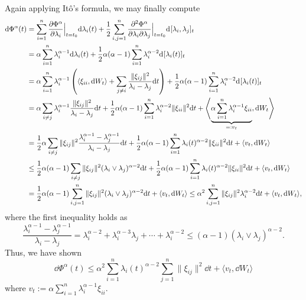 Again applying Itô's formula, we may finally compute
\begin{align*}
  \dd \Phi^\alpha(t) & = \sum_{i = 1}^n \pdv{\Phi^\alpha}{\lambda_i}\Big\vert_{t = t_0} \dd \lambda_i(t)
    + \frac{1}{2}\sum_{i, j = 1}^n \pdv[2]{\Phi^\alpha}{\lambda_i}{\lambda_j}\Big\vert_{t = t_0} \dd[][\lambda_i, \lambda_j]_{t}\\
  & = \alpha \sum_{i = 1}^n \lambda_i^{\alpha - 1} \dd \lambda_i(t)
    + \frac{1}{2}\alpha(\alpha - 1)\sum_{i = 1}^n \lambda_i^{\alpha - 2} \dd[][\lambda_i(t)]_{t}\\
  & = \alpha \sum_{i = 1}^n \lambda_i^{\alpha - 1} \left(\langle \xi_{ii}, \dd W_t\rangle 
    + \sum_{j \neq i} \frac{\|\xi_{ij}\|^2}{\lambda_i - \lambda_j} \dd t\right) 
    + \frac{1}{2}\alpha(\alpha - 1)\sum_{i = 1}^n \lambda_i^{\alpha - 2} \dd[][\lambda_i(t)]_{t}\\
  & = \alpha \sum_{i \neq j}\lambda_i^{\alpha - 1} \frac{\|\xi_{ij}\|^2}{\lambda_i - \lambda_j} \dd t 
    + \frac{1}{2}\alpha(\alpha - 1)\sum_{i = 1}^n \lambda_i^{\alpha - 2} \|\xi_{ii}\|^2 \dd t
    + \left\langle\underbrace{\alpha \sum_{i = 1}^n \lambda_i^{\alpha - 1} \xi_{ii}}_{=: v_t}, \dd W_t\right\rangle\\
  & = \frac{1}{2}\alpha \sum_{i \neq j}\|\xi_{ij}\|^2\frac{\lambda_i^{\alpha - 1} - \lambda_j^{\alpha -1}}{\lambda_i - \lambda_j}\dd t
    + \frac{1}{2}\alpha(\alpha - 1)\sum_{i = 1}^n \lambda_i(t)^{\alpha - 2} \|\xi_{ii}\|^2 \dd t + \langle v_t, \dd W_t\rangle\\
  & \le \frac{1}{2}\alpha(\alpha - 1) \sum_{i \neq j}\|\xi_{ij}\|^2 (\lambda_i \vee \lambda_j)^{\alpha - 2} \dd t
    + \frac{1}{2}\alpha(\alpha - 1)\sum_{i = 1}^n \lambda_i(t)^{\alpha - 2} \|\xi_{ii}\|^2 \dd t + \langle v_t, \dd W_t\rangle\\
  & = \frac{1}{2}\alpha(\alpha - 1) \sum_{i, j = 1}^n\|\xi_{ij}\|^2 (\lambda_i \vee \lambda_j)^{\alpha - 2} \dd t
    + \langle v_t, \dd W_t\rangle
    \le \alpha^2 \sum_{i, j = 1}^n\|\xi_{ij}\|^2 \lambda_i^{\alpha - 2} \dd t + \langle v_t, \dd W_t\rangle,
\end{align*}
where the first inequality holds as 
\[\frac{\lambda_i^{\alpha - 1} - \lambda_j^{\alpha -1}}{\lambda_i - \lambda_j}
  = \lambda_i^{\alpha - 2} + \lambda_i^{\alpha - 3}\lambda_j + \cdots + \lambda_i^{\alpha - 2} 
  \le (\alpha - 1)(\lambda_i \vee \lambda_j)^{\alpha - 2}.\]
Thus, we have shown 
\begin{equation}\label{eq:potential_bound}
  \dd \Phi^\alpha(t) \le \alpha^2 \sum_{i = 1}^n \lambda_i(t)^{\alpha - 2} \sum_{j = 1}^n \|\xi_{ij}\|^2 \dd t + \langle v_t, \dd W_t\rangle
\end{equation}
where \(v_t := \alpha \sum_{i = 1}^n \lambda_i^{\alpha - 1}\xi_{ii}\).

